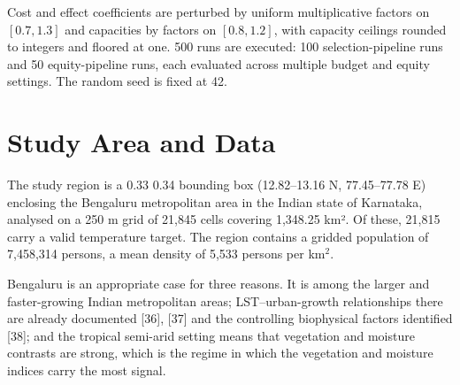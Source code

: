 Cost and effect coefficients are perturbed by uniform multiplicative factors on \([0.7, 1.3]\) and
capacities by factors on \([0.8, 1.2]\), with capacity ceilings rounded to integers and floored at one.
500 runs are executed: 100 selection-pipeline runs and 50 equity-pipeline runs, each evaluated across
multiple budget and equity settings. The random seed is fixed at 42.

\section{Study Area and Data}\label{iv.-study-area-and-data}

The study region is a 0.33\textdegree{} \texttimes{} 0.34\textdegree{} bounding box (12.82--13.16\textdegree{} N, 77.45--77.78\textdegree{} E) enclosing the
Bengaluru metropolitan area in the Indian state of Karnataka, analysed on a 250 m grid of 21,845
cells covering 1,348.25 km². Of these, 21,815 carry a valid temperature target. The region contains
a gridded population of 7,458,314 persons, a mean density of 5,533 persons per km\(^2\).

Bengaluru is an appropriate case for three reasons. It is among the larger and faster-growing Indian
metropolitan areas; LST--urban-growth relationships there are already documented {[}36{]}, {[}37{]} and the
controlling biophysical factors identified {[}38{]}; and the tropical semi-arid setting means that
vegetation and moisture contrasts are strong, which is the regime in which the vegetation and
moisture indices carry the most signal.

